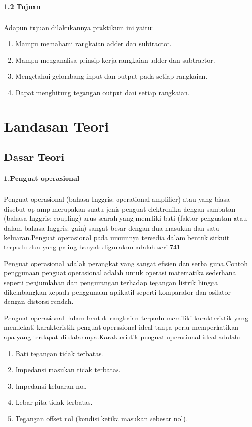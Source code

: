 \documentclass[12pt,a4paper]{article}
\begin{document}
\paragraph{1.2 Tujuan}
\subparagraph{ }
Adapun tujuan dilakukannya praktikum ini yaitu:
\begin{enumerate}
\item Mampu memahami rangkaian adder dan subtractor.
\item Mampu menganalisa prinsip kerja rangkaian adder dan subtractor.
\item Mengetahui gelombang input dan output pada setiap rangkaian.
\item Dapat menghitung tegangan output dari setiap rangkaian.
\end{enumerate}


\newpage
\section{Landasan Teori}
\subsection{Dasar Teori}
\paragraph{ }
\textbf{1.Penguat operasional}
\subparagraph{ }
 Penguat operasional (bahasa Inggris: operational amplifier) atau yang biasa disebut op-amp merupakan suatu jenis penguat elektronika dengan sambatan (bahasa Inggris: coupling) arus searah yang memiliki bati (faktor penguatan atau dalam bahasa Inggris: gain) sangat besar dengan dua masukan dan satu keluaran.Penguat operasional pada umumnya tersedia dalam bentuk sirkuit terpadu dan yang paling banyak digunakan adalah seri 741.

Penguat operasional adalah perangkat yang sangat efisien dan serba guna.Contoh penggunaan penguat operasional adalah untuk operasi matematika sederhana seperti penjumlahan dan pengurangan terhadap tegangan listrik hingga dikembangkan kepada penggunaan aplikatif seperti komparator dan osilator dengan distorsi rendah.

Penguat operasional dalam bentuk rangkaian terpadu memiliki karakteristik yang mendekati karakteristik penguat operasional ideal tanpa perlu memperhatikan apa yang terdapat di dalamnya.Karakteristik penguat operasional ideal adalah:
\begin{enumerate}
\item Bati tegangan tidak terbatas.
\item Impedansi masukan tidak terbatas.
\item Impedansi keluaran nol.
\item Lebar pita tidak terbatas.
\item Tegangan offset nol (kondisi ketika masukan sebesar nol).
\end{enumerate}
	
\end{document}

